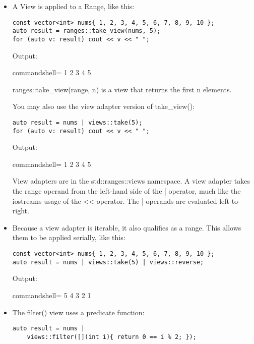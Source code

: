 \begin{itemize}
\item 
A View is applied to a Range, like this:

\begin{lstlisting}[style=styleCXX]
const vector<int> nums{ 1, 2, 3, 4, 5, 6, 7, 8, 9, 10 };
auto result = ranges::take_view(nums, 5);
for (auto v: result) cout << v << " ";
\end{lstlisting}

Output:

\begin{tcblisting}{commandshell={}}
1 2 3 4 5
\end{tcblisting}

ranges::take\_view(range, n) is a view that returns the first n elements.

You may also use the view adapter version of take\_view():

\begin{lstlisting}[style=styleCXX]
auto result = nums | views::take(5);
for (auto v: result) cout << v << " ";
\end{lstlisting}

Output:

\begin{tcblisting}{commandshell={}}
1 2 3 4 5
\end{tcblisting}

View adapters are in the std::ranges::views namespace. A view adapter takes the range operand from the left-hand side of the | operator, much like the iostreams usage of the <{}< operator. The | operands are evaluated left-to-right.

\item 
Because a view adapter is iterable, it also qualifies as a range. This allows them to be applied serially, like this:

\begin{lstlisting}[style=styleCXX]
const vector<int> nums{ 1, 2, 3, 4, 5, 6, 7, 8, 9, 10 };
auto result = nums | views::take(5) | views::reverse;
\end{lstlisting}

Output:

\begin{tcblisting}{commandshell={}}
5 4 3 2 1
\end{tcblisting}

\item 
The filter() view uses a predicate function:

\begin{lstlisting}[style=styleCXX]
auto result = nums |
	views::filter([](int i){ return 0 == i % 2; });
\end{lstlisting}


\end{itemize}
